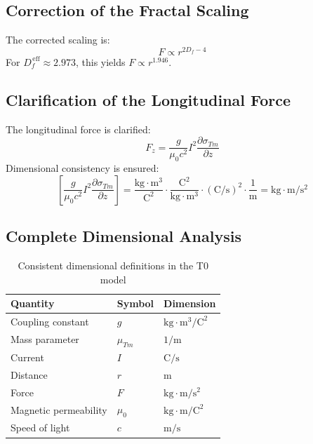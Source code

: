 	\subsection{Correction of the Fractal Scaling}
	The corrected scaling is:
	\begin{equation}
		F \propto r^{2D_f - 4} \label{eq:fractal_scaling_final}
	\end{equation}
	For $D_f^{\,\text{eff}} \approx 2.973$, this yields $F \propto r^{1.946}$.
	
	\subsection{Clarification of the Longitudinal Force}
	The longitudinal force is clarified:
	\begin{equation}
		F_z = \frac{g}{\mu_0 c^2} I^2 \frac{\partial \sigma_{Tm}}{\partial z} \label{eq:long_force_final}
	\end{equation}
	Dimensional consistency is ensured:
	\begin{equation}
		\left[\frac{g}{\mu_0 c^2} I^2 \frac{\partial \sigma_{Tm}}{\partial z}\right] = \frac{\text{kg} \cdot \text{m}^3}{\text{C}^2} \cdot \frac{\text{C}^2}{\text{kg} \cdot \text{m}^3} \cdot (\text{C}/\text{s})^2 \cdot \frac{1}{\text{m}} = \text{kg} \cdot \text{m}/\text{s}^2
	\end{equation}
	
	\subsection{Complete Dimensional Analysis}
	\begin{table}[h]
		\centering
		\begin{tabular}{lll}
			\hline
			Quantity & Symbol & Dimension \\
			\hline
			Coupling constant & $g$ & $\text{kg} \cdot \text{m}^3/\text{C}^2$ \\
			Mass parameter & $\mu_{Tm}$ & $1/\text{m}$ \\
			Current & $I$ & $\text{C}/\text{s}$ \\
			Distance & $r$ & $\text{m}$ \\
			Force & $F$ & $\text{kg} \cdot \text{m}/\text{s}^2$ \\
			Magnetic permeability & $\mu_0$ & $\text{kg} \cdot \text{m}/\text{C}^2$ \\
			Speed of light & $c$ & $\text{m}/\text{s}$ \\
			\hline
		\end{tabular}
		\caption{Consistent dimensional definitions in the T0 model}
		\label{tab:dimensions}
	\end{table}
	
